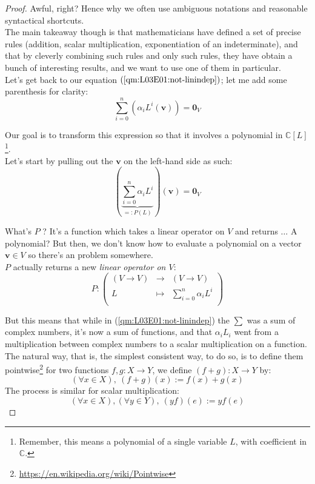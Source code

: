 \documentclass[solutions.tex]{subfiles}
\renewcommand{\bm}[1]{\pmb{#1}}
\begin{document}
\begin{proof}
Awful, right? Hence why we often use ambiguous notations and
reasonable syntactical shortcuts. \\

The main takeaway though is that mathematicians have defined a set
of precise rules (addition, scalar multiplication, exponentiation of
an indeterminate), and that by cleverly combining such rules and
only such rules, they have obtain a bunch of interesting results,
and we want to use one of them in particular.\\

Let's get back to our equation $(\ref{qm:L03E01:not-linindep})$; let me
add some parenthesis for clarity:
\[
	\sum_{i=0}^n \left(\alpha_iL^i(\bm{v})\right) = \bm{0}_V
\]

Our goal is to transform this expression so that it involves
a polynomial in $\mathbb{C}[L]$\footnote{Remember, this means a
polynomial of a single variable $L$, with coefficient in $\mathbb{C}$.}. \\

Let's start by pulling out the $\bm{v}$ on the left-hand side as such:
\[
	\left(\underbrace{
		\sum_{i=0}^n \alpha_iL^i
	}_{=:P(L)}\right)(\bm{v}) = \bm{0}_V
\]

What's $P$ ? It's a function which takes a linear operator on $V$
and returns $\ldots$ A polynomial? But then, we don't know how to
evaluate a polynomial on a vector $\bm{v}\in V$ so there's an problem
somewhere. \\

$P$ actually returns a new \textit{linear operator on $V$}:
\[
	P : \begin{pmatrix}
		(V \rightarrow V) & \rightarrow & (V \rightarrow V) \\
		L & \mapsto & \sum_{i=0}^n \alpha_iL^i \\
	\end{pmatrix}
\]

But this means that while in (\ref{qm:L03E01:not-linindep}) the
$\sum$ was a sum of complex numbers, it's now a sum of functions,
and that $\alpha_i L_i$ went from a multiplication between complex
numbers to a scalar multiplication on a function. \\

The natural way, that is, the simplest consistent way, to do so,
is to define them pointwise\footnote{\url{
https://en.wikipedia.org/wiki/Pointwise}} for two functions
$f, g : X \rightarrow Y$, we define $(f+g) : X \rightarrow Y$
by:
\[
	(\forall x \in X),\ (f+g)(x) := f(x) + g(x)
\]
The process is similar for scalar multiplication:
\[
	(\forall x \in X), (\forall y \in Y),\ (yf)(e) := yf(e)
\]


\end{proof}
\end{document}
